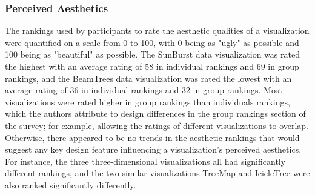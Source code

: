 \documentclass[twocolumn]{article}
\newcommand{\forceindent}{\leavevmode{\parindent=2em\indent}}
\begin{document}
		\subsubsection{Perceived Aesthetics}
		\forceindent The rankings used by participants to rate the aesthetic qualities of a visualization were quantified on a scale from 0 to 100, with 0 being as "ugly" as possible and 100 being as "beautiful" as possible. The SunBurst data visualization was rated the highest with an average rating of 58 in individual rankings and 69 in group rankings, and  the BeamTrees data visualization was rated the lowest with an average rating of 36 in individual rankings and 32 in group rankings. Most visualizations were rated higher in group rankings than individuals rankings, which the authors attribute to design differences in the group rankings section of the survey; for example, allowing the ratings of different visualizations to overlap. Otherwise, there appeared to be no trends in the aesthetic rankings that would suggest any key design feature influencing a visualization's perceived aesthetics. For instance, the three three-dimensional visualizations all had significantly different rankings, and the two similar visualizations TreeMap and IcicleTree were also ranked significantly differently.
		
\end{document}
